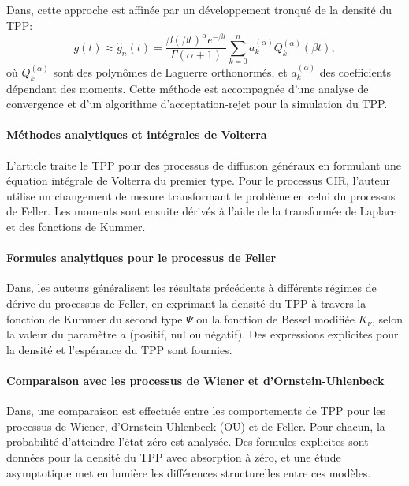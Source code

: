 Dans\cite{dinardo2024}, cette approche est affinée par un développement tronqué de la densité du \acs{TPP}:
\[
g(t) \approx \hat{g}_n(t) = \frac{\beta {(\beta t)}^\alpha e^{-\beta t}}{\Gamma(\alpha+1)} \sum_{k=0}^n a_k^{(\alpha)} Q_k^{(\alpha)}(\beta t),
\]
où \( Q_k^{(\alpha)} \) sont des polynômes de Laguerre orthonormés, et \( a_k^{(\alpha)} \) des coefficients dépendant des moments. Cette méthode est accompagnée d'une analyse de convergence et d'un algorithme d'acceptation-rejet pour la simulation du \acs{TPP}.

\paragraph{Méthodes analytiques et intégrales de Volterra}

L'article\cite{kepplinger2017} traite le \acs{TPP} pour des processus de diffusion généraux en formulant une équation intégrale de Volterra du premier type. Pour le processus \acs{CIR}, l'auteur utilise un changement de mesure transformant le problème en celui du processus de Feller. Les moments sont ensuite dérivés à l'aide de la transformée de Laplace et des fonctions de Kummer.

\paragraph{Formules analytiques pour le processus de Feller}

Dans\cite{giorno2021}, les auteurs généralisent les résultats précédents à différents régimes de dérive du processus de Feller, en exprimant la densité du \acs{TPP} à travers la fonction de Kummer du second type \( \Psi \) ou la fonction de Bessel modifiée \( K_\nu \), selon la valeur du paramètre \( a \) (positif, nul ou négatif). Des expressions explicites pour la densité et l'espérance du \acs{TPP} sont fournies.

\paragraph{Comparaison avec les processus de Wiener et d'Ornstein-Uhlenbeck}

Dans\cite{giorno2023}, une comparaison est effectuée entre les comportements de \acs{TPP} pour les processus de Wiener, d'Ornstein-Uhlenbeck (OU) et de Feller. Pour chacun, la probabilité d'atteindre l'état zéro est analysée. Des formules explicites sont données pour la densité du \acs{TPP} avec absorption à zéro, et une étude asymptotique met en lumière les différences structurelles entre ces modèles.

